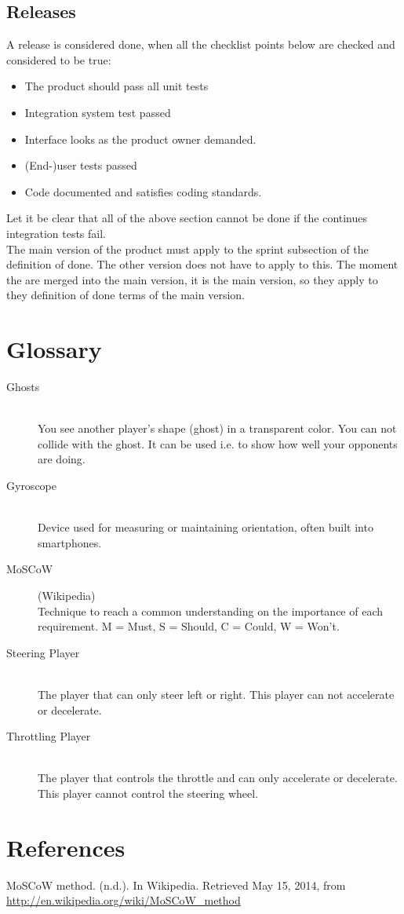 \documentclass[11pt,twoside,a4paper]{article}
\begin{document}
\subsection{Releases}
A release is considered done, when all the checklist points below are checked and considered to be true:
\begin{itemize}
	\item The product should pass all unit tests
	\item Integration system test passed
	\item Interface looks as the product owner demanded.
	\item (End-)user tests passed
	\item Code documented and satisfies coding standards.
\end{itemize}
Let it be clear that all of the above section cannot be done if the continues integration tests fail.\\
The main version of the product must apply to the sprint subsection of the definition of done. The other version does not have to apply to this. The moment the are merged into the main version, it is the main version, so they apply to they definition of done terms of the main version.
\newpage
\section{Glossary}
\begin{description}
\item[Ghosts] \hfill \\
You see another player's shape (ghost) in a transparent color. You can not collide with the ghost. It can be used i.e. to show how well your opponents are doing.
\item[Gyroscope] \hfill \\
Device used for measuring or maintaining orientation, often built into smartphones.
\item[MoSCoW] (Wikipedia) \hfill \\
Technique to reach a common understanding on the importance of each requirement. M = Must, S = Should, C = Could, W = Won't.
\item[Steering Player] \hfill \\
The player that can only steer left or right. This player can not accelerate or decelerate.
\item[Throttling Player] \hfill \\
The player that controls the throttle and can only accelerate or decelerate. This player cannot control the steering wheel.

\end{description}


\section*{References}
MoSCoW method. (n.d.). In Wikipedia. Retrieved May 15, 2014, from \url{http://en.wikipedia.org/wiki/MoSCoW_method}
\end{document}
